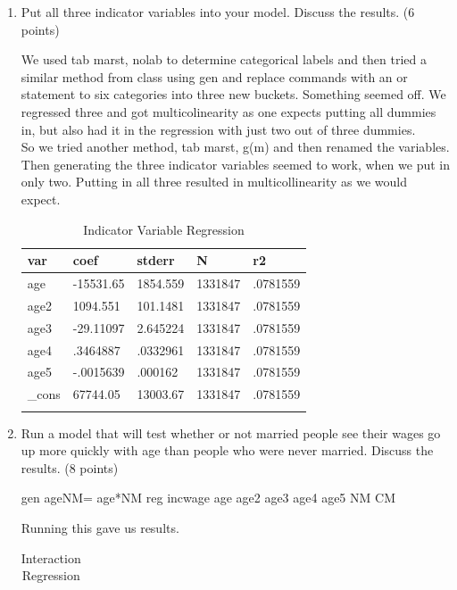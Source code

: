 \documentclass{article}
\begin{document}
\begin{enumerate}[label=\alph*]
\item  Put all three indicator variables into your model. Discuss the results. (6 points)

We used tab marst, nolab to determine categorical labels and then tried a similar method from class using 
gen and replace commands with an or statement to six categories into three new buckets. Something seemed off.
We regressed three and got multicolinearity as one expects putting all dummies in, but also had it in the regression 
with just two out of three dummies.\\

So we tried another method, tab marst, g(m) and then renamed the variables. Then generating the three indicator variables seemed to work,
when we put in only two. Putting in all three resulted in multicollinearity as we would expect.

\begin{table}[tbp] \centering
	
	\caption{Indicator Variable Regression}
	\begin{tabularx}{\textwidth}{lCCCC}
		
		\toprule
		{var}&{coef}&{stderr}&{N}&{r2} \tabularnewline
		\midrule\addlinespace[1.5ex]
		age&-15531.65&1854.559&1331847&.0781559 \tabularnewline
		age2&1094.551&101.1481&1331847&.0781559 \tabularnewline
		age3&-29.11097&2.645224&1331847&.0781559 \tabularnewline
		age4&.3464887&.0332961&1331847&.0781559 \tabularnewline
		age5&-.0015639&.000162&1331847&.0781559 \tabularnewline
		\_cons&67744.05&13003.67&1331847&.0781559 \tabularnewline
		\bottomrule \addlinespace[1.5ex]
		
	\end{tabularx}
\end{table}

\item Run a model that will test whether or not married people see their wages go up
more quickly with age than people who were never married. Discuss the results.
(8 points)

gen ageNM= age*NM
reg incwage age age2 age3 age4 age5 NM CM 

Running this gave us results.

\begin{table}[tbp] \centering
	
	\caption{Interaction Regression}
	\begin{tabularx}{\textwidth}{lCCCC}
		

\end{tabularx}
\end{table}
\end{enumerate}
\end{document}
